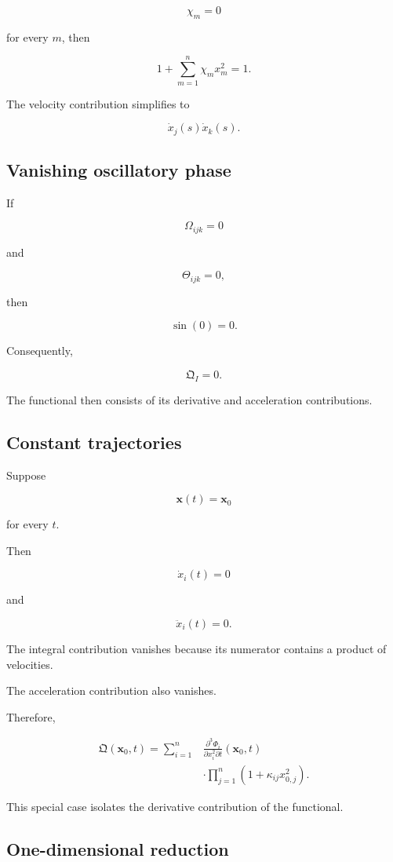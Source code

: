 \documentclass[12pt]{article}
\numberwithin{equation}{section}
\newcommand{\Q}{\mathfrak{Q}}
\theoremstyle{definition}
\theoremstyle{remark}
\begin{document}
\[
\chi_m=0
\]

for every \(m\), then

\[
1+\sum_{m=1}^{n}\chi_mx_m^2=1.
\]

The velocity contribution simplifies to

\[
\dot{x}_j(s)\dot{x}_k(s).
\]

\subsection{Vanishing oscillatory phase}

If

\[
\Omega_{ijk}=0
\]

and

\[
\Theta_{ijk}=0,
\]

then

\[
\sin(0)=0.
\]

Consequently,

\[
\Q_I=0.
\]

The functional then consists of its
derivative and acceleration contributions.

\subsection{Constant trajectories}

Suppose

\[
\mathbf{x}(t)=\mathbf{x}_0
\]

for every \(t\).

Then

\[
\dot{x}_i(t)=0
\]

and

\[
\ddot{x}_i(t)=0.
\]

The integral contribution vanishes because
its numerator contains a product of velocities.

The acceleration contribution also vanishes.

Therefore,

\[
\begin{aligned}
\Q(\mathbf{x}_0,t)
=
\sum_{i=1}^{n}
&
\frac{\partial^3\Phi_i}
{\partial x_i^2\partial t}
(\mathbf{x}_0,t)
\\
&\cdot
\prod_{j=1}^{n}
(1+\kappa_{ij}x_{0,j}^2).
\end{aligned}
\]

This special case isolates the derivative
contribution of the functional.

\subsection{One-dimensional reduction}
\end{document}
